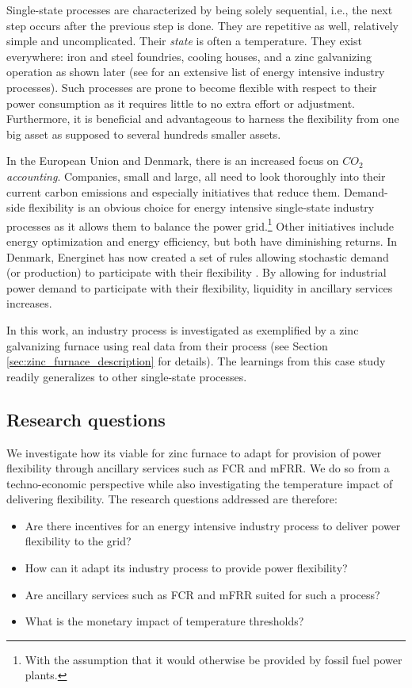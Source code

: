 \documentclass[sigconf]{acmart}
\begin{document}
Single-state processes are characterized by being solely sequential, i.e., the next step occurs after the previous step is done. They are repetitive as well, relatively simple and uncomplicated. Their \textit{state} is often a temperature. They exist everywhere: iron and steel foundries, cooling houses, and a zinc galvanizing operation as shown later (see \cite{paulus2011potential} for an extensive list of energy intensive industry processes). Such processes are prone to become flexible with respect to their power consumption as it requires little to no extra effort or adjustment. Furthermore, it is beneficial and advantageous to harness the flexibility from one big asset as supposed to several hundreds smaller assets.

In the European Union and Denmark, there is an increased focus on $CO_{2}$ \textit{accounting}. Companies, small and large, all need to look thoroughly into their current carbon emissions and especially initiatives that reduce them. Demand-side flexibility is an obvious choice for energy intensive single-state industry processes as it allows them to balance the power grid.\footnote{With the assumption that it would otherwise be provided by fossil fuel power plants.} Other initiatives include energy optimization and energy efficiency, but both have diminishing returns. In Denmark, Energinet has now created a set of rules allowing stochastic demand (or production) to participate with their flexibility \cite{energinet:prequalification}. By allowing for industrial power demand to participate with their flexibility, liquidity in ancillary services increases.

In this work, an industry process is investigated as exemplified by a zinc galvanizing furnace using real data from their process (see Section \ref{sec:zinc_furnace_description} for details). The learnings from this case study readily generalizes to other single-state processes.


\subsection{Research questions}

We investigate how its viable for zinc furnace to adapt for provision of power flexibility through ancillary services such as FCR and mFRR. We do so from a techno-economic perspective while also investigating the temperature impact of delivering flexibility. The research questions addressed are therefore:


\begin{itemize}
    \item Are there incentives for an energy intensive industry process to deliver power flexibility to the grid?
    \item How can it adapt its industry process to provide power flexibility?
    \item Are ancillary services such as FCR and mFRR suited for such a process?
    \item What is the monetary impact of temperature thresholds?
\end{itemize}
\end{document}
